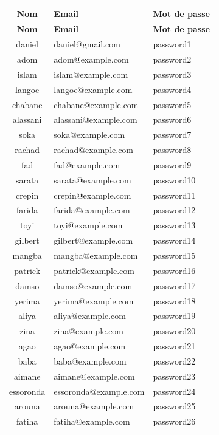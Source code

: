 \documentclass[12pt,a4paper]{article}
\begin{document}
\begin{longtable}{|c|m{5cm}|m{5cm}|}
\hline
\textbf{Nom} & \textbf{Email} & \textbf{Mot de passe} \\
\hline
\endfirsthead
\hline
\textbf{Nom} & \textbf{Email} & \textbf{Mot de passe} \\
\hline
\endhead
\hline
daniel & daniel@gmail.com & password1 \\
\hline
adom & adom@example.com & password2 \\
\hline
islam & islam@example.com & password3 \\
\hline
langoe & langoe@example.com & password4 \\
\hline
chabane & chabane@example.com & password5 \\
\hline
alassani & alassani@example.com & password6 \\
\hline
soka & soka@example.com & password7 \\
\hline
rachad & rachad@example.com & password8 \\
\hline
fad & fad@example.com & password9 \\
\hline
sarata & sarata@example.com & password10 \\
\hline
crepin & crepin@example.com & password11 \\
\hline
farida & farida@example.com & password12 \\
\hline
toyi & toyi@example.com & password13 \\
\hline
gilbert & gilbert@example.com & password14 \\
\hline
mangba & mangba@example.com & password15 \\
\hline
patrick & patrick@example.com & password16 \\
\hline
damso & damso@example.com & password17 \\
\hline
yerima & yerima@example.com & password18 \\
\hline
aliya & aliya@example.com & password19 \\
\hline
zina & zina@example.com & password20 \\
\hline
agao & agao@example.com & password21 \\
\hline
baba & baba@example.com & password22 \\
\hline
aimane & aimane@example.com & password23 \\
\hline
essoronda & essoronda@example.com & password24 \\
\hline
arouna & arouna@example.com & password25 \\
\hline
fatiha & fatiha@example.com & password26 \\

\end{longtable}
\end{document}
